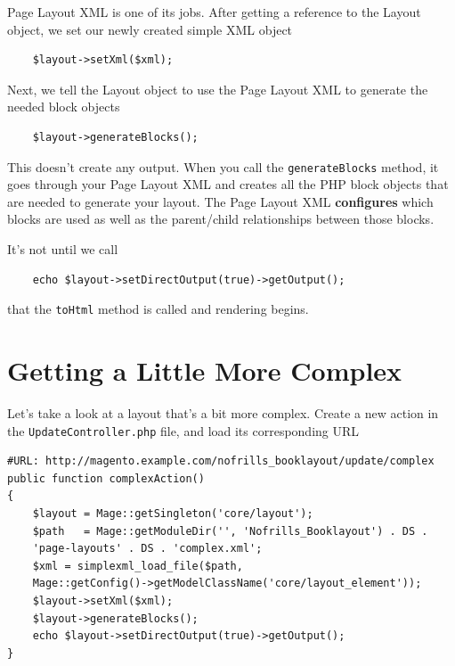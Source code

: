\documentclass[oneside]{book}
\begin{document}
Page Layout XML is one of its jobs.  After getting a reference to the Layout object, we set our newly created simple XML object

\begin{lstlisting}
    $layout->setXml($xml);

\end{lstlisting}


Next, we tell the Layout object to use the Page Layout XML to generate the needed block objects

\begin{lstlisting}
    $layout->generateBlocks();

\end{lstlisting}


This doesn't create any output.  When you call the \footnotesize\texttt{generateBlocks} \normalsize  method, it goes through your Page Layout XML and creates all the PHP block objects that are needed to generate your layout.  The Page Layout XML \textbf{configures} which blocks are used as well as the parent/child relationships between those blocks.

It's not until we call

\begin{lstlisting}
    echo $layout->setDirectOutput(true)->getOutput();

\end{lstlisting}


that the \footnotesize\texttt{toHtml} \normalsize  method is called and rendering begins.

\section{Getting a Little More Complex}

Let's take a look at a layout that's a bit more complex.  Create a new action in the \footnotesize\texttt{UpdateController.php} \normalsize  file, and load its corresponding URL

\begin{lstlisting}
#URL: http://magento.example.com/nofrills_booklayout/update/complex
public function complexAction()
{
    $layout = Mage::getSingleton('core/layout');
    $path   = Mage::getModuleDir('', 'Nofrills_Booklayout') . DS .
    'page-layouts' . DS . 'complex.xml';
    $xml = simplexml_load_file($path,
    Mage::getConfig()->getModelClassName('core/layout_element'));
    $layout->setXml($xml);
    $layout->generateBlocks();
    echo $layout->setDirectOutput(true)->getOutput();
}

\end{lstlisting}
\end{document}
